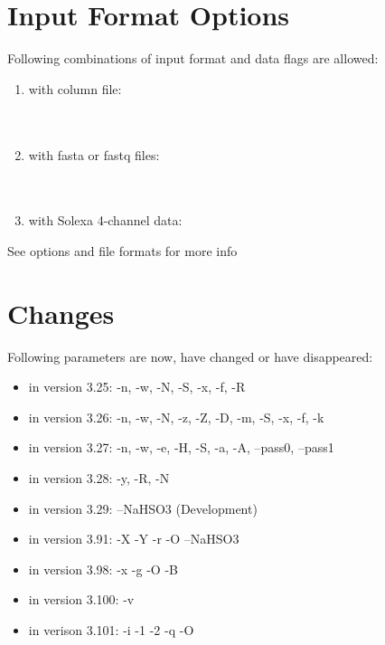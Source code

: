 \documentclass[english]{article}
\begin{document}
	    
	     
	   

\section{Input Format Options}

	Following combinations of input format and data flags are allowed:

	\begin{enumerate}
	\item with column file:\\
		  \\
		  \\
		  
	\item with fasta or fastq files:\\
		   \\
		   \\
		   
	\item with Solexa 4-channel data:\\
		    
	\end{enumerate}

	See options and file formats for more info

\section{Changes}
	Following parameters are now, have changed or have disappeared:\\
	\begin{itemize}
    \item in version 3.25: -n, -w, -N, -S, -x, -f, -R 
    \item in version 3.26: -n, -w, -N, -z, -Z, -D, -m, -S, -x, -f, -k
    \item in version 3.27: -n, -w, -e, -H, -S, -a, -A, --pass0, --pass1
    \item in version 3.28: -y, -R, -N
    \item in version 3.29: --NaHSO3 (Development)
    \item in version 3.91: -X -Y -r -O --NaHSO3 
    \item in version 3.98: -x -g -O -B
    \item in version 3.100: -v 
    \item in verison 3.101: -i -1 -2 -q -O
	\end{itemize}
\end{document}
